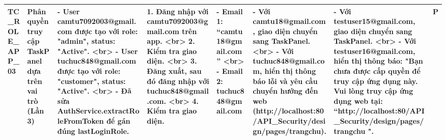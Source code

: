\documentclass[a4paper,12pt]{article}
\begin{document}
\begin{longtable}{|p{2cm}|p{3cm}|p{3cm}|p{4cm}|p{3cm}|p{3cm}|p{3cm}|p{2cm}|}
    TC_ROLE_APP_03 & Phân quyền truy cập TaskPanel dựa trên vai trò (Lần 3) & - User camtu7092003@gmail.com được tạo với role: "admin", status: "Active". <br> - User tuchuc848@gmail.com được tạo với role: "customer", status: "Active". <br> - Đã sửa AuthService.extractRoleFromToken để gán đúng lastLoginRole. & 1. Đăng nhập với camtu7092003@gmail.com trên app. <br> 2. Kiểm tra giao diện. <br> 3. Đăng xuất, sau đó đăng nhập với tuchuc848@gmail.com. <br> 4. Kiểm tra giao diện. & - Email 1: “camtu18@gmail.com” <br> - Email 2: tuchuc848@gmail.com & - Với camtu18@gmail.com, giao diện chuyển sang TaskPanel. <br> - Với tuchuc848@gmail.com, hiển thị thông báo lỗi và yêu cầu chuyển hướng đến web (http://localhost:80/API_Security/design/pages/trangchu). & - Với testuser15@gmail.com, giao diện chuyển sang TaskPanel. <br> - Với testuser16@gmail.com, hiển thị thông báo: "Bạn chưa được cấp quyền để truy cập ứng dụng này. Vui lòng truy cập ứng dụng web tại: “http://localhost:80/API_Security/design/pages/trangchu ". & P \\ \hline
\end{longtable}
\end{document}
